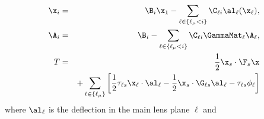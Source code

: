 \begin{eqnarray}
\x_{i} &=& \B_i \x_1 - \sum_{\ell \in \{\ell_\mu<i\}} \C_{\ell i} \al_\ell(\x_\ell), \\
\A_{i} &=& \B_i - \sum_{\ell \in \{\ell_\mu<i\}} \C_{\ell i} \GammaMat_\ell \A_\ell, \\
T &=& \frac{1}{2} \x_s \cdot \F_s \x \nonumber \\
&&+ \sum\limits_{\ell \in \{\ell_\mu\}}\left[\frac{1}{2}\tau_{\ell s} \x_\ell \cdot \al_\ell -\frac{1}{2}\x_s \cdot \G_{\ell s}\al_\ell -\tau_{\ell s}\phi_\ell \right]
\end{eqnarray}
\normalsize
where $\al_\ell$ is the deflection in the main lens plane $\ell$ and  